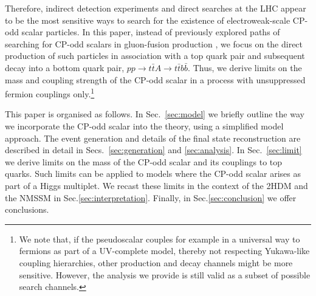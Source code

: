 Therefore, indirect detection experiments and direct searches at the LHC appear to be the most sensitive ways to search for the existence of electroweak-scale CP-odd scalar particles. In this paper, instead of previously explored paths of searching for CP-odd scalars in gluon-fusion production \cite{Klamke:2007cu,Dolan:2014upa}, we focus on the direct production of such particles in association with a top quark pair and subsequent decay into a bottom quark pair, $p p \to t \bar{t} A \to t \bar{t} b \bar{b}$. Thus, we derive limits on the mass and coupling strength of the CP-odd scalar in a process with unsuppressed fermion couplings only.\footnote{We note that, if the pseudoscalar couples for example in a universal way to fermions as part of a UV-complete model, thereby not respecting Yukawa-like coupling hierarchies, other production and decay channels might be more sensitive. However, the analysis we provide is still valid as a subset of possible search channels.}

This paper is organised as follows. In Sec.~\ref{sec:model} we briefly outline the way we incorporate the CP-odd scalar into the theory, using a simplified model approach. The event generation and details of the final state reconstruction are described in detail in Secs.~\ref{sec:generation} and \ref{sec:analysis}. In Sec.~\ref{sec:limit} we derive limits on the mass of the CP-odd scalar and its couplings to top quarks. Such limits can be applied to models where the CP-odd scalar arises as part of a Higgs multiplet. We recast these limits in the context of the 2HDM and the NMSSM in Sec.\ref{sec:interpretation}. Finally, in Sec.\ref{sec:conclusion} we offer conclusions.

